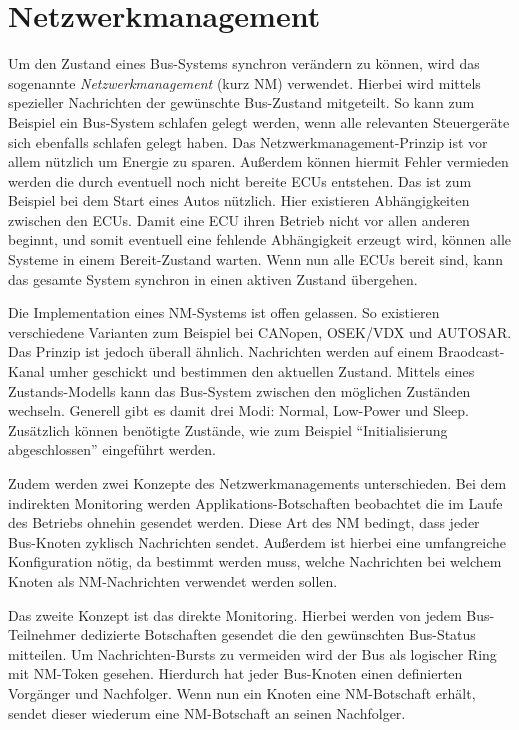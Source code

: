 \documentclass[
  a4paper,					    %
  twoside,
  DIV=calc,     				%
  bibliography=totoc,
  cleardoublepage=empty,
  ngerman,     					%
  final       					%
]{scrbook}
\begin{document}
\section{Netzwerkmanagement}
\label{sec:Netzwerkmanagement}
Um den Zustand eines Bus-Systems synchron verändern zu können, wird das sogenannte \emph{Netzwerkmanagement} (kurz NM) verwendet. Hierbei wird mittels spezieller Nachrichten der gewünschte Bus-Zustand mitgeteilt. So kann zum Beispiel ein Bus-System schlafen gelegt werden, wenn alle relevanten Steuergeräte sich ebenfalls schlafen gelegt haben. Das Netzwerkmanagement-Prinzip ist vor allem nützlich um Energie zu sparen. Außerdem können hiermit Fehler vermieden werden die durch eventuell noch nicht bereite ECUs entstehen. Das ist zum Beispiel bei dem Start eines Autos nützlich. Hier existieren Abhängigkeiten zwischen den ECUs. Damit eine ECU ihren Betrieb nicht vor allen anderen beginnt, und somit eventuell eine fehlende Abhängigkeit erzeugt wird, können alle Systeme in einem Bereit-Zustand warten. Wenn nun alle ECUs bereit sind, kann das gesamte System synchron in einen aktiven Zustand übergehen.

Die Implementation eines NM-Systems ist offen gelassen. So existieren verschiedene Varianten zum Beispiel bei CANopen, OSEK/VDX und AUTOSAR. Das Prinzip ist jedoch überall ähnlich. Nachrichten werden auf einem Braodcast-Kanal umher geschickt und bestimmen den aktuellen Zustand. Mittels eines Zustands-Modells kann das Bus-System zwischen den möglichen Zuständen wechseln. Generell gibt es damit drei Modi: Normal, Low-Power und Sleep. Zusätzlich können benötigte Zustände, wie zum Beispiel "`Initialisierung abgeschlossen"' eingeführt werden.

Zudem werden zwei Konzepte des Netzwerkmanagements unterschieden. Bei dem indirekten Monitoring werden Applikations-Botschaften beobachtet die im Laufe des Betriebs ohnehin gesendet werden. Diese Art des NM bedingt, dass jeder Bus-Knoten zyklisch Nachrichten sendet. Außerdem ist hierbei eine umfangreiche Konfiguration nötig, da bestimmt werden muss, welche Nachrichten bei welchem Knoten als NM-Nachrichten verwendet werden sollen.

Das zweite Konzept ist das direkte Monitoring. Hierbei werden von jedem Bus-Teilnehmer dedizierte Botschaften gesendet die den gewünschten Bus-Sta\-tus mitteilen. Um Nachrichten-Bursts zu vermeiden wird der Bus als logischer Ring mit NM-Token gesehen. Hierdurch hat jeder Bus-Knoten einen definierten Vorgänger und Nachfolger. Wenn nun ein Knoten eine NM-Botschaft erhält, sendet dieser wiederum eine NM-Botschaft an seinen Nachfolger.
\end{document}
